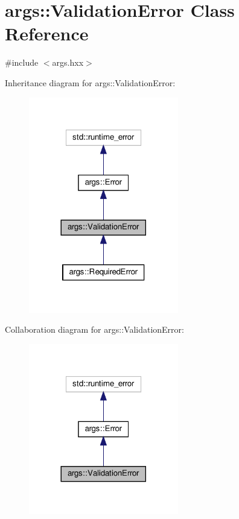 \hypertarget{classargs_1_1_validation_error}{}\section{args\+:\+:Validation\+Error Class Reference}
\label{classargs_1_1_validation_error}


{\ttfamily \#include $<$args.\+hxx$>$}



Inheritance diagram for args\+:\+:Validation\+Error\+:\nopagebreak
\begin{figure}[H]
\begin{center}
\leavevmode
\includegraphics[width=185pt]{classargs_1_1_validation_error__inherit__graph}
\end{center}
\end{figure}


Collaboration diagram for args\+:\+:Validation\+Error\+:\nopagebreak
\begin{figure}[H]
\begin{center}
\leavevmode
\includegraphics[width=185pt]{classargs_1_1_validation_error__coll__graph}
\end{center}
\end{figure}
